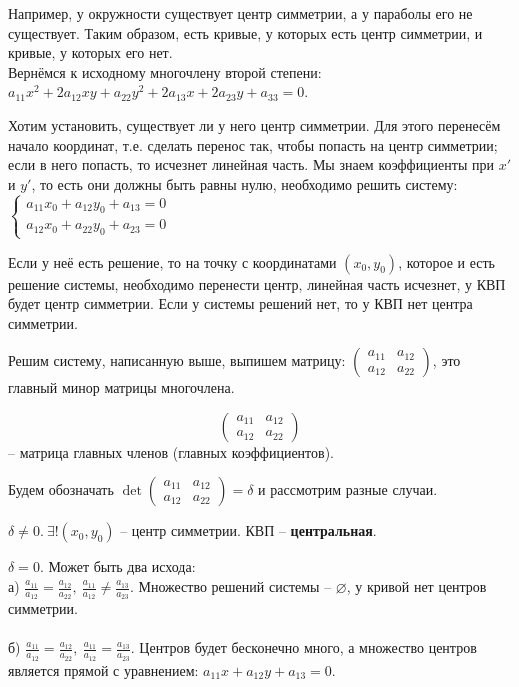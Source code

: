  Например, у окружности существует центр симметрии, а у параболы его не существует. Таким образом, есть кривые, у которых есть центр симметрии, и кривые, у которых его нет. \\

 Вернёмся к исходному многочлену второй степени: \\
 $a_{11} x^2 + 2 a_{12}xy + a_{22} y^2 + 2 a_{13}x + 2 a_{23}y + a_{33} = 0$. 
 
 Хотим установить, существует ли у него центр симметрии. Для этого перенесём начало координат, т.е. сделать перенос так, чтобы попасть на центр симметрии; если в него попасть, то исчезнет линейная часть. Мы знаем коэффициенты при $x'$ и $y'$, то есть они должны быть равны нулю, необходимо решить систему:
$\begin{cases}
	a_{11}x_0 + a_{12}y_0 + a_{13} = 0 \\
    a_{12}x_0 + a_{22}y_0 + a_{23} = 0
\end{cases}$ 

Если у неё есть решение, то на точку с координатами $(x_0, y_0)$, которое и есть решение системы, необходимо перенести центр, линейная часть исчезнет, у КВП будет центр симметрии. Если у системы решений нет, то у КВП нет центра симметрии. 

Решим систему, написанную выше, выпишем матрицу: 
$\left( \begin{array}{cccc}
    a_{11} & a_{12}\\
	a_{12} & a_{22}
    \end{array}\right)$, это главный минор матрицы многочлена.

\begin{Def}
	$$\left( \begin{array}{cccc}
		a_{11} & a_{12}\\
		a_{12} & a_{22}
		\end{array}\right)$$ -- матрица главных членов (главных коэффициентов).
\end{Def}

Будем обозначать $\det 
\left( \begin{array}{cccc}
	a_{11} & a_{12}\\
	a_{12} & a_{22}
	\end{array}\right) = \delta$ и рассмотрим разные случаи.

\begin{MyList}
	\item $\delta \neq 0. \ \exists ! (x_0, y_0) $ -- центр симметрии. КВП -- \textbf{центральная}.
	\item $\delta = 0$. Может быть два исхода: \\ 
	а) $\displaystyle \frac{a_{11}}{a_{12}} = \frac{a_{12}}{a_{22}}, \ \displaystyle \frac{a_{11}}{a_{12}} \neq \frac{a_{13}}{a_{23}}$. 
	Множество решений системы -- $\varnothing$, у кривой нет центров симметрии.\\ \\
	б) $\displaystyle \frac{a_{11}}{a_{12}} = \frac{a_{12}}{a_{22}}, \ \displaystyle \frac{a_{11}}{a_{12}} = \frac{a_{13}}{a_{23}}$. 
	Центров будет бесконечно много, а множество центров является прямой с уравнением: $a_{11}x + a_{12}y + a_{13} = 0$.

\end{MyList}

